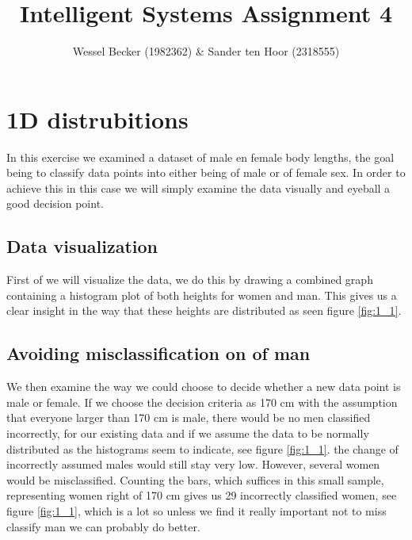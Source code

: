 \documentclass[10pt,a4paper]{article}
\begin{document}
\title{Intelligent Systems Assignment 4}
\author{Wessel Becker (1982362) \& Sander ten Hoor (2318555)}
\maketitle

\newcommand{\simplefigure}[3]{
	\begin{figure}[H]
  	\centering
    	\makebox[\textwidth]
    	{
    		\texttt{[image: \#1]}
 		} \\
  		\caption{#2}
  		\label{#3}
	\end{figure}
}
\newcommand{\mcode}[1]{
	
}

\section{1D distrubitions}
In this exercise we examined a dataset of male en female body lengths, the goal being to classify data points into either being of male or of female sex. In order to achieve this in this case we will simply examine the data visually and eyeball a good decision point.

\subsection{Data visualization}
First of we will visualize the data, we do this by drawing a combined graph containing a histogram plot of both heights for women and man. This gives us a clear insight in the way that these heights are distributed as seen figure \ref{fig:1_1}. 

\subsection{Avoiding misclassification on of man}
We then examine the way we could choose to decide whether a new data point is male or female. If we choose the decision criteria as 170 cm with the assumption that everyone larger than 170 cm is male, there would be no men classified incorrectly, for our existing data and if we assume the data to be normally distributed as the histograms seem to indicate, see figure \ref{fig:1_1}. the change of incorrectly assumed males would still stay very low. However, several women would be misclassified. Counting the bars, which suffices in this small sample, representing women right of 170 cm gives us 29 incorrectly classified women, see figure \ref{fig:1_1}, which is a lot so unless we find it really important not to miss classify man we can probably do better.
\end{document}
